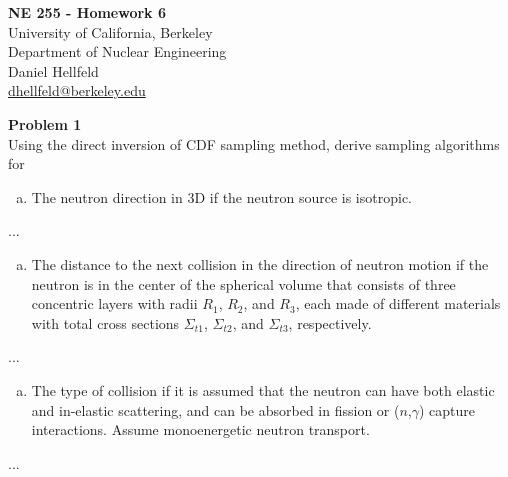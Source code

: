 \documentclass[10pt]{article}
\begin{document}
\begin{centering}
\textbf{\large NE 255 - Homework 6}\\
\vspace{10pt}
University of California, Berkeley\\
Department of Nuclear Engineering\\
\vspace{10pt}
Daniel Hellfeld\\
\href{mailto:dhellfeld@berkeley.edu}{dhellfeld@berkeley.edu}\\
\end{centering}






\vspace{20pt}
\noindent \textbf{Problem 1}\\
Using the direct inversion of CDF sampling method, derive sampling algorithms for

\begin{enumerate}[(a)]
	\item The neutron direction in 3D if the neutron source is isotropic.
\end{enumerate}

...

%
%
%

\begin{enumerate}[(b)]
	\item The distance to the next collision in the direction of neutron motion if the neutron is in the center of the spherical volume that consists of three concentric layers with radii $R_1$, $R_2$, and $R_3$, each made of different materials with total cross sections $\Sigma_{t1}$, $\Sigma_{t2}$, and $\Sigma_{t3}$, respectively.
\end{enumerate}

...

%
%
%

\begin{enumerate}[(c)]
	\item The type of collision if it is assumed that the neutron can have both elastic and in-elastic scattering, and can be absorbed in fission or ($n$,$\gamma$) capture interactions. Assume monoenergetic neutron transport.
\end{enumerate}

...
\end{document}
